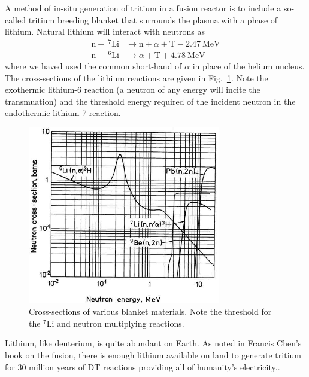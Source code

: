 A method of in-situ generation of tritium in a fusion reactor is to include a so-called tritium breeding blanket that surrounds the plasma with a phase of lithium. Natural lithium will interact with neutrons as
\begin{subequations}\label{eq:lithium-t}
\begin{align}
	\mathrm{n} + ~^7\mathrm{Li} &\xrightarrow ~\mathrm{n}+\alpha + \mathrm{T} -2.47~\text{MeV}\label{eq:li7-t}\\
	\mathrm{n} + ~^6\mathrm{Li} &\xrightarrow ~ \alpha + \mathrm{T} +4.78~\text{MeV} \label{eq:li6-t}
\end{align}
\end{subequations}
where we haved used the common short-hand of $\alpha$ in place of the helium nucleus. The cross-sections of the lithium reactions are given in Fig.~\ref{fig:li-xsects}. Note the exothermic lithium-6 reaction (a neutron of any energy will incite the transmuation) and the threshold energy required of the incident neutron in the endothermic lithium-7 reaction.

\begin{figure}
	\centering
	\includegraphics[width=0.75\textwidth]{chapters/figures/breeding_xsecs} 
	\caption{Cross-sections of various blanket materials. Note the threshold for the $^7$Li and neutron multiplying reactions.}
	\label{fig:li-xsects}
\end{figure}

Lithium, like deuterium, is quite abundant on Earth. As noted in Francis Chen's book on the fusion, there is enough lithium available on land to generate tritium for 30 million years of DT reactions providing all of humanity's electricity.\cite{chens-textbook}. 

